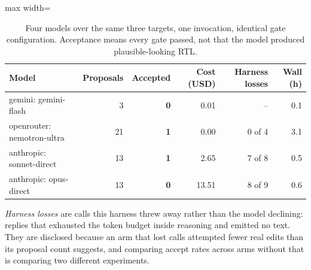 \begin{table}[htbp]
  \centering
  \footnotesize
  \caption{Four models over the same three targets, one invocation, identical gate configuration. Acceptance means every gate passed, not that the model produced plausible-looking RTL.}
  \label{tab:bakeoff}
  \begin{adjustbox}{max width=\textwidth}
  \begin{tabular}{lrrrrr}
    \toprule
    \textbf{Model} & \textbf{Proposals} & \textbf{Accepted} & \textbf{Cost (USD)} & \textbf{Harness losses} & \textbf{Wall (h)} \\
    \midrule
    gemini: gemini-flash & 3 & \textbf{0} & 0.01 & -- & 0.1 \\
    openrouter: nemotron-ultra & 21 & \textbf{1} & 0.00 & 0 of 4 & 3.1 \\
    anthropic: sonnet-direct & 13 & \textbf{1} & 2.65 & 7 of 8 & 0.5 \\
    anthropic: opus-direct & 13 & \textbf{0} & 13.51 & 8 of 9 & 0.6 \\
    \bottomrule
  \end{tabular}
  \end{adjustbox}
  \par\smallskip\footnotesize\raggedright \emph{Harness losses} are calls this harness threw away rather than the model declining: replies that exhausted the token budget inside reasoning and emitted no text. They are disclosed because an arm that lost calls attempted fewer real edits than its proposal count suggests, and comparing accept rates across arms without that is comparing two different experiments.
\end{table}

